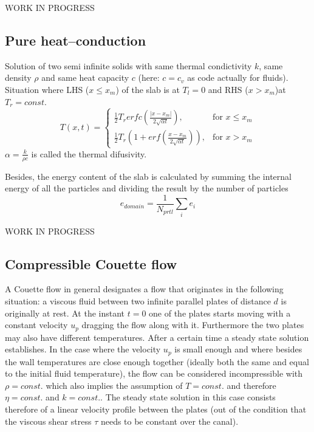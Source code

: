 \documentclass{report}
\begin{document}
WORK IN PROGRESS 

\subsection{Pure heat--conduction}
 
Solution of two semi infinite solids with same thermal condictivity $k$, same density $\rho$ and same heat capacity $c$ (here: $c=c_v$ as code actually for fluids). Situation where LHS ($x \leq x_m$) of the slab is at $T_l=0$ and RHS ($x > x_m$)at $T_r=const.$ \cite{Carslaw1959}
\begin{equation}
 T(x,t)=\begin{cases}
\frac{1}{2} T_r erfc\left(\frac{|x-x_m|}{2\sqrt{\alpha t}}\right),& \text{for  $x\leq x_m$} \\
\frac{1}{2} T_r\left(1+erf\left(\frac{x-x_m}{2\sqrt{\alpha t}}\right)\right),& \text{for  $x> x_m$}
\end{cases}
\end{equation}
$\alpha=\frac{k}{\rho c}$ is called the thermal difusivity. 

Besides, the energy content of the slab is calculated by summing the internal energy of all the particles and dividing the result by the number of particles
\begin{equation}
 \label{eq:energyContent}
e_{\mathit{domain}}=\frac{1}{N_{\mathit{prtl}}}\sum_i e_i
\end{equation}


WORK IN PROGRESS 

\subsection{Compressible Couette flow}
A Couette flow in general designates a flow that originates in the following situation: a viscous fluid between two infinite parallel plates of distance $d$ is originally at rest. At the instant $t=0$ one of the plates starts moving with a constant velocity $u_p$ dragging the flow along with it. Furthermore the two plates may also have different temperatures. After a certain time a steady state solution establishes. 
In the case where the velocity $u_p$ is small enough and where besides the wall temperatures are close enough together (ideally both the same and equal to the initial fluid temperature), the flow can be considered incompressible with $\rho=const.$ which also implies the assumption of $T=const$. and therefore $\eta=const.$ and $k=const.$. The steady state solution in this case consists therefore of a linear velocity profile between the plates (out of the condition that the viscous shear stress $\tau$ needs to be constant over the canal).
\end{document}
